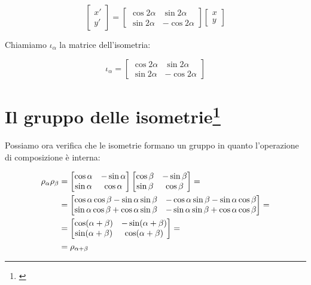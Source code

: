 \begin{equation}
	\begin{bmatrix}
		x' \\
		y' 
	\end{bmatrix}
	=
	\begin{bmatrix}
		\cos 2\alpha & \sin 2\alpha \\
		\sin 2\alpha & -\cos 2\alpha
	\end{bmatrix}
	\begin{bmatrix}
		x \\
		y 
	\end{bmatrix}
\end{equation}

Chiamiamo $\iota_\alpha$ la matrice dell'isometria:

\begin{equation}
	\iota_\alpha =
	\begin{bmatrix}
		\cos 2\alpha & \sin 2\alpha \\
		\sin 2\alpha & -\cos 2\alpha
	\end{bmatrix}
\end{equation}

\section[Il gruppo delle isometrie]{Il gruppo delle isometrie\footnote{\cite[7 novembre 2021]{lucchini}}}

Possiamo ora verifica che le isometrie formano un gruppo in quanto l'operazione di composizione è interna:

\begin{align}
	\rho_\alpha \rho_\beta & = 
	\begin{bmatrix}
		\cos \alpha & -\sin \alpha \\
		\sin \alpha & \cos \alpha
	\end{bmatrix}
	\begin{bmatrix}
		\cos \beta & -\sin \beta \\
		\sin \beta & \cos \beta
	\end{bmatrix} 
	= \notag \\
	& = 
	\begin{bmatrix}
		\cos \alpha \cos \beta -\sin \alpha \sin \beta & - \cos \alpha \sin \beta - \sin \alpha \cos \beta \\
		\sin \alpha \cos \beta + \cos \alpha \sin \beta & - \sin \alpha \sin \beta + \cos \alpha \cos \beta
	\end{bmatrix} 
	= \notag \\
	& = 
	\begin{bmatrix}
		\cos (\alpha + \beta) & - \sin (\alpha + \beta) \\
		\sin (\alpha + \beta) & \cos (\alpha + \beta)
	\end{bmatrix} 
	= \notag \\
	\label{eqn:Isometrie_R_R}
	& = \rho_{\alpha + \beta}
\end{align}


